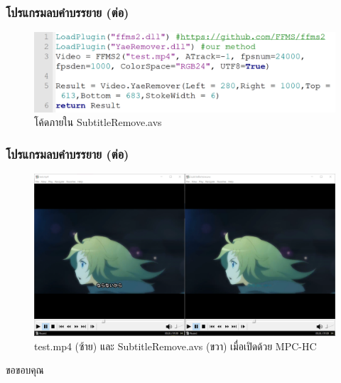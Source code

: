 \documentclass[xcolor=dvipsnames, xetex,serif]{beamer}
\numberwithin{equation}{section}
\begin{document}
		\begin{frame}
			\frametitle{โปรแกรมลบคำบรรยาย (ต่อ)}
			\begin{figure}
				\includegraphics[width=0.8\linewidth]{images/demo_anime/notepad.png}
				\caption{โค้ดภายใน SubtitleRemove.avs}
			\end{figure}
		\end{frame}
		\begin{frame}
			\frametitle{โปรแกรมลบคำบรรยาย (ต่อ)}
			\begin{figure}
				\includegraphics[width=0.8\linewidth]{images/demo_anime/result.png}
				\caption{test.mp4 (ซ้าย) และ SubtitleRemove.avs (ขวา) เมื่อเปิดด้วย MPC-HC}
			\end{figure}
		\end{frame}
		\begin{frame}
			\centering
			\Huge{ขอขอบคุณ}
		\end{frame}
	
\end{document}
